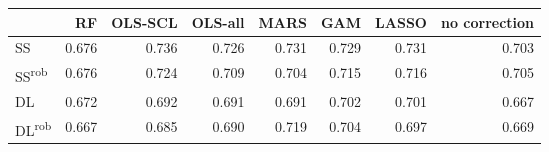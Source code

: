 \begin{tabular}{lrrrrrrr}
\toprule
 & RF & OLS-SCL & OLS-all & MARS & GAM & LASSO & no correction \\
\midrule
SS & {\cellcolor[HTML]{D1D1D1}} \color[HTML]{000000} 0.676 & {\cellcolor[HTML]{000000}} \color[HTML]{F1F1F1} 0.736 & {\cellcolor[HTML]{232323}} \color[HTML]{F1F1F1} 0.726 & {\cellcolor[HTML]{111111}} \color[HTML]{F1F1F1} 0.731 & {\cellcolor[HTML]{181818}} \color[HTML]{F1F1F1} 0.729 & {\cellcolor[HTML]{111111}} \color[HTML]{F1F1F1} 0.731 & {\cellcolor[HTML]{737373}} \color[HTML]{F1F1F1} 0.703 \\
SS\textsuperscript{rob} & {\cellcolor[HTML]{D1D1D1}} \color[HTML]{000000} 0.676 & {\cellcolor[HTML]{2A2A2A}} \color[HTML]{F1F1F1} 0.724 & {\cellcolor[HTML]{5E5E5E}} \color[HTML]{F1F1F1} 0.709 & {\cellcolor[HTML]{6F6F6F}} \color[HTML]{F1F1F1} 0.704 & {\cellcolor[HTML]{494949}} \color[HTML]{F1F1F1} 0.715 & {\cellcolor[HTML]{464646}} \color[HTML]{F1F1F1} 0.716 & {\cellcolor[HTML]{6C6D6C}} \color[HTML]{F1F1F1} 0.705 \\
DL & {\cellcolor[HTML]{E0E0E0}} \color[HTML]{000000} 0.672 & {\cellcolor[HTML]{9A9A9A}} \color[HTML]{F1F1F1} 0.692 & {\cellcolor[HTML]{9D9D9D}} \color[HTML]{F1F1F1} 0.691 & {\cellcolor[HTML]{9D9D9D}} \color[HTML]{F1F1F1} 0.691 & {\cellcolor[HTML]{777777}} \color[HTML]{F1F1F1} 0.702 & {\cellcolor[HTML]{7A7A7A}} \color[HTML]{F1F1F1} 0.701 & {\cellcolor[HTML]{F1F1F1}} \color[HTML]{000000} 0.667 \\
DL\textsuperscript{rob} & {\cellcolor[HTML]{F1F1F1}} \color[HTML]{000000} 0.667 & {\cellcolor[HTML]{B2B2B2}} \color[HTML]{000000} 0.685 & {\cellcolor[HTML]{A0A0A0}} \color[HTML]{F1F1F1} 0.690 & {\cellcolor[HTML]{3B3B3B}} \color[HTML]{F1F1F1} 0.719 & {\cellcolor[HTML]{6F6F6F}} \color[HTML]{F1F1F1} 0.704 & {\cellcolor[HTML]{888888}} \color[HTML]{F1F1F1} 0.697 & {\cellcolor[HTML]{EAEAEA}} \color[HTML]{000000} 0.669 \\
\bottomrule
\end{tabular}
